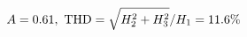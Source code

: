 \documentclass[preview]{standalone}
\begin{document}
\begin{align*}
\special{dvisvgm:raw <g id='unique000'>}A=0.61,\ \text{THD}=\sqrt{H_2^2+H_3^2}/H_1=11.6\%\special{dvisvgm:raw </g>}
\end{align*}
\end{document}
